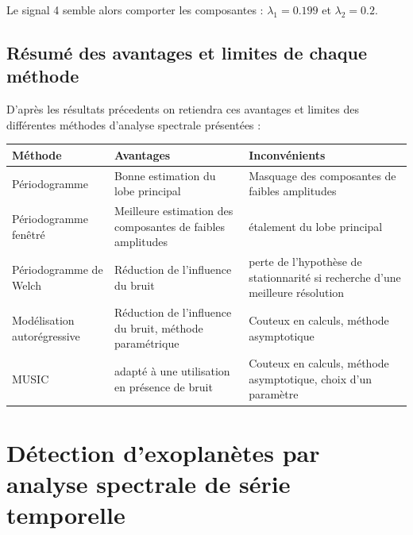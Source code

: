 \documentclass[12pt,a4paper,titlepage]{article}
\begin{document}
Le signal 4 semble alors comporter les composantes : $\lambda_1 = 0.199$ et $\lambda_2 = 0.2$.

\subsection*{Résumé des avantages et limites de chaque méthode}

D'après les résultats précedents on retiendra ces avantages et limites des différentes méthodes
d'analyse spectrale présentées :

\begin{table}[h]
    \begin{tabularx}{\textwidth}{ |l|X|X| }
        \hline
        Méthode & Avantages & Inconvénients \\
        \hline
        Périodogramme & Bonne estimation du lobe principal & Masquage des composantes de faibles amplitudes \\
        \hline
        Périodogramme fenêtré & Meilleure estimation des composantes de faibles amplitudes & étalement du lobe principal \\
        \hline
        Périodogramme de Welch & Réduction de l'influence du bruit & perte de l'hypothèse de stationnarité si recherche d'une meilleure résolution \\
        \hline
        Modélisation autorégressive & Réduction de l'influence du bruit, méthode paramétrique & Couteux en calculs, méthode asymptotique \\
        \hline
        MUSIC & adapté à une utilisation en présence de bruit & Couteux en calculs, méthode asymptotique, choix d'un paramètre \\
        \hline
    \end{tabularx}
\end{table}

\section{Détection d'exoplanètes par analyse spectrale de série temporelle}
\end{document}
